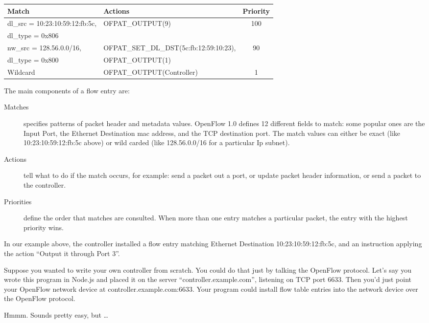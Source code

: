 \bigskip
\begin{tabularx}{6in}{|l|l|c|}
\hline\hline
Match & Actions & Priority
\\ \hline
dl\_src = 10:23:10:59:12:fb:5c, & OFPAT\_OUTPUT(9) & 100
\\
dl\_type = 0x806 & &  
\\ \hline
nw\_src = 128.56.0.0/16, & OFPAT\_SET\_DL\_DST(5c:fb:12:59:10:23), & 90 
\\
dl\_type = 0x800 & OFPAT\_OUTPUT(1) &
\\ \hline
Wildcard & OFPAT\_OUTPUT(Controller) & 1
\\ \hline\hline
\end{tabularx}

\bigskip

The main components of a flow entry are:

\begin{description}
\item[Matches] specifies patterns of packet header and metadata values.
OpenFlow 1.0 defines 12 different fields to match: some popular ones are the Input Port, 
the Ethernet Destination mac address, and the TCP destination port.
The match values can either be exact (like 10:23:10:59:12:fb:5c above) or wild carded (like 128.56.0.0/16 for a
particular Ip subnet).
\item[Actions] tell what to do if the match occurs,  
for example: send a packet out a port, or update packet header information, 
or send a packet to the controller. 
\item[Priorities] define the order that matches are consulted.  
When more than one entry matches a particular packet, the entry with the highest priority wins.
\end{description}

In our example above, the controller installed a flow entry matching Ethernet Destination 10:23:10:59:12:fb:5c, 
and an instruction applying the action ``Output it through Port 3''.

Suppose you wanted to write your own controller from scratch.  
You could do that just by talking the OpenFlow protocol.
Let's say you wrote this program in Node.js and placed it on the server ``controller.example.com'', 
listening on TCP port 6633.
Then you'd just point your OpenFlow network device at controller.example.com:6633.
Your program could install flow table entries into the network device over the OpenFlow protocol.

Hmmm.
Sounds pretty easy, but \ldots

